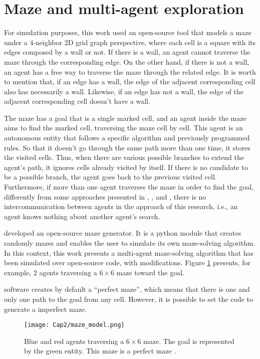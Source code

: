 \label{section_models}
\section{Maze and multi-agent exploration}
\label{section_models_maze}
For simulation purposes, this work used an open-source tool that models a maze under a 4-neighbor 2D grid graph perspective, where each cell is a square with its edges composed by a wall or not. If there is a wall, an agent cannot traverse the maze through the corresponding edge. On the other hand, if there is not a wall, an agent has a free way to traverse the maze through the related edge. It is worth to mention that, if an edge has a wall, the edge of the adjacent corresponding cell also has necessarily a wall. Likewise, if an edge has not a wall, the edge of the adjacent corresponding cell doesn't have a wall.

The maze has a goal that is a single marked cell, and an agent inside the maze aims to find the marked cell, traversing the maze cell by cell. This agent is an autonomous entity that follows a specific algorithm and previously programmed rules. So that it doesn't go through the same path more than one time, it stores the visited cells. Thus, when there are various possible branches to extend the agent's path, it ignores cells already visited by itself. If there is no candidate to be a possible branch, the agent goes back to the previous visited cell. Furthermore, if more than one agent traverses the maze in order to find the goal, differently from some approaches presented in , , and , there is no intercommunication between agents in the approach of this research, i.e., an agent knows nothing about another agent's search.

 developed an open-source maze generator. It is a python module that creates randomly mazes and enables the user to simulate its own maze-solving algorithm. In this context, this work presents a multi-agent maze-solving algorithm that has been simulated over  open-source code, with modifications. Figure \ref{maze_model} presents, for example, 2 agents traversing a $6 \times 6$ maze toward the goal.

 software creates by default a ``perfect maze'', which means that there is one and only one path to the goal from any cell. However, it is possible to set the code to generate a imperfect maze.

\begin{figure}[ht!]
\centering
\texttt{[image: Cap2/maze\_model.png]}
\caption{Blue and red agents traversing a $6\times 6$ maze. The goal is represented by the green entity. This maze is a perfect maze \cite{Muhammad2021}.}
\label{maze_model}
\end{figure}

